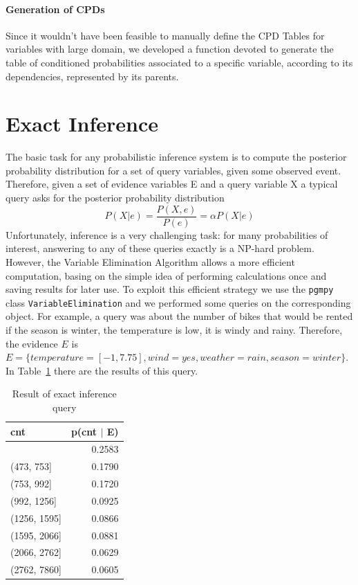 \documentclass[letterpaper,11pt]{article}
\begin{document}
\paragraph{Generation of CPDs}
Since it wouldn't have been feasible to manually define the CPD Tables for variables with large
domain, we developed a function devoted to generate the table of conditioned probabilities associated
to a specific variable, according to its dependencies, represented by its parents.

\section{Exact Inference}

The basic task for any probabilistic inference system is to compute the posterior
 probability distribution for a set of query variables, given some observed event. Therefore, 
 given a set of evidence variables E and a query variable X a typical query asks for the posterior probability distribution 
\begin{equation}
P(X| e) = \frac{P(X, e)}{P(e)} = \alpha P(X| e) 
\end{equation}
Unfortunately, inference is a very challenging task: for many probabilities of interest, 
answering to any of these queries exactly is a NP-hard problem. However, the Variable 
Elimination Algorithm allows a more efficient computation, basing on the simple idea of
 performing calculations once and saving results for later use. To exploit this 
 efficient strategy we use the \texttt{pgmpy} class \texttt{VariableElimination}
and we performed some queries on the corresponding object. For example, a query was 
about the number of bikes that would be rented if the season is winter, the temperature is low, 
it is windy and rainy. Therefore, the evidence $E$ is $E = \{temperature = [-1, 7.75], wind = yes, weather = rain, season = winter\}$.
In Table~\ref{tab:exact-inference} there are the results of this query.

\begin{table}
  \centering
  \begin{tabular}[]{l r}
    \hline
    \textbf{cnt} & \textbf{p(cnt $|$ E)}\\
    \hline
    [47, 473] & 0.2583 \\
    (473, 753] & 0.1790 \\
    (753, 992] & 0.1720 \\
    (992, 1256] & 0.0925 \\
    (1256, 1595] & 0.0866 \\
    (1595, 2066] & 0.0881 \\
    (2066, 2762] & 0.0629 \\
    (2762, 7860] & 0.0605 \\
    \hline
  \end{tabular}
  \caption{Result of exact inference query}
  \label{tab:exact-inference}
\end{table}
\end{document}
